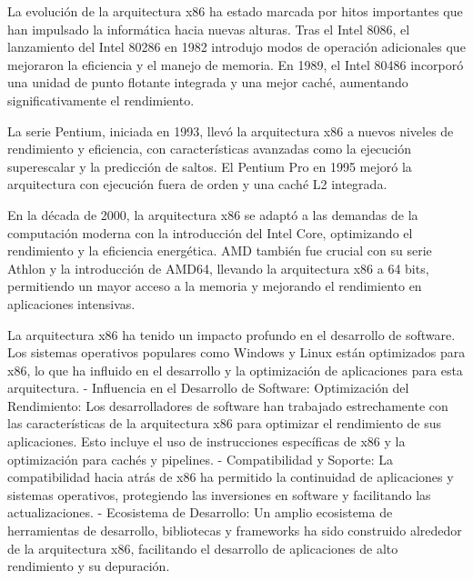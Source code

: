 \documentclass[12pt,twoside]{templates/unerthesis}
\begin{document}
La evolución de la arquitectura x86 ha estado marcada por hitos importantes que han impulsado la informática hacia nuevas alturas. Tras el Intel 8086, el lanzamiento del Intel 80286 en 1982 introdujo modos de operación adicionales que mejoraron la eficiencia y el manejo de memoria. En 1989, el Intel 80486 incorporó una unidad de punto flotante integrada y una mejor caché, aumentando significativamente el rendimiento.

La serie Pentium, iniciada en 1993, llevó la arquitectura x86 a nuevos niveles de rendimiento y eficiencia, con características avanzadas como la ejecución superescalar y la predicción de saltos. El Pentium Pro en 1995 mejoró la arquitectura con ejecución fuera de orden y una caché L2 integrada.

En la década de 2000, la arquitectura x86 se adaptó a las demandas de la computación moderna con la introducción del Intel Core, optimizando el rendimiento y la eficiencia energética. AMD también fue crucial con su serie Athlon y la introducción de AMD64, llevando la arquitectura x86 a 64 bits, permitiendo un mayor acceso a la memoria y mejorando el rendimiento en aplicaciones intensivas.

La arquitectura x86 ha tenido un impacto profundo en el desarrollo de software. Los sistemas operativos populares como Windows y Linux están optimizados para x86, lo que ha influido en el desarrollo y la optimización de aplicaciones para esta arquitectura.
- Influencia en el Desarrollo de Software: Optimización del Rendimiento: Los desarrolladores de software han trabajado estrechamente con las características de la arquitectura x86 para optimizar el rendimiento de sus aplicaciones. Esto incluye el uso de instrucciones específicas de x86 y la optimización para cachés y pipelines.
- Compatibilidad y Soporte: La compatibilidad hacia atrás de x86 ha permitido la continuidad de aplicaciones y sistemas operativos, protegiendo las inversiones en software y facilitando las actualizaciones.
- Ecosistema de Desarrollo: Un amplio ecosistema de herramientas de desarrollo, bibliotecas y frameworks ha sido construido alrededor de la arquitectura x86, facilitando el desarrollo de aplicaciones de alto rendimiento y su depuración.
\end{document}
